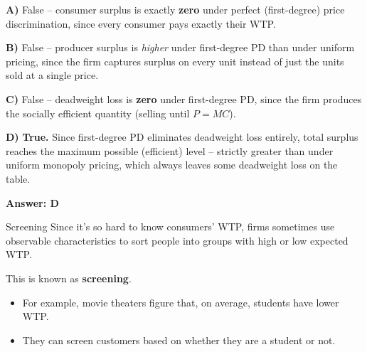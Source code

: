 \documentclass{beamer}
\begin{document}
\begin{frame}


  \bigskip
  \textbf{A)} False -- consumer surplus is exactly \textbf{zero} under perfect (first-degree) price discrimination, since every consumer pays exactly their WTP.

  \bigskip
  \textbf{B)} False -- producer surplus is \emph{higher} under first-degree PD than under uniform pricing, since the firm captures surplus on every unit instead of just the units sold at a single price.

  \bigskip
  \textbf{C)} False -- deadweight loss is \textbf{zero} under first-degree PD, since the firm produces the socially efficient quantity (selling until $P=MC$).

  \bigskip
  \textbf{D)} \textbf{True.} Since first-degree PD eliminates deadweight loss entirely, total surplus reaches the maximum possible (efficient) level -- strictly greater than under uniform monopoly pricing, which always leaves some deadweight loss on the table.

  \textbf{Answer: D}
\end{frame}


\begin{frame}{Screening}
  Since it's so hard to know consumers' WTP, firms sometimes use observable characteristics to sort people into groups with high or low expected WTP.
  
  This is known as \textbf{screening}.

  \begin{itemize}
    \item For example, movie theaters figure that, on average, students have lower WTP.
    \item They can screen customers based on whether they are a student or not.
  \end{itemize}
\end{frame}
\end{document}
